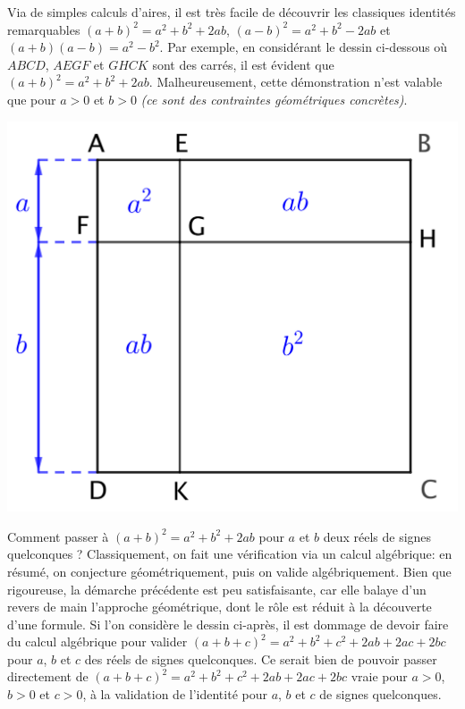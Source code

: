 Via de simples calculs d'aires, il est très facile de découvrir les classiques identités remarquables
$(a + b)^2 = a^2 + b^2 + 2ab$,
$(a - b)^2 = a^2 + b^2 - 2ab$
et
$(a + b)(a - b) = a^2 - b^2$.
%
Par exemple, en considérant le dessin ci-dessous où $ABCD$, $AEGF$ et $GHCK$ sont des carrés,
il est évident que $(a + b)^2 = a^2 + b^2 + 2 ab$.
Malheureusement, cette démonstration n'est valable que pour $a > 0$ et $b > 0$ \emph{(ce sont des contraintes géométriques concrètes)}.

\begin{center}
	\includegraphics[scale = .7]{(a+b)^2.png}
\end{center}


Comment passer à $(a + b)^2 = a^2 + b^2 + 2 ab$ pour $a$ et $b$ deux réels de signes quelconques ?
Classiquement, on fait une vérification via un calcul algébrique: en résumé, on conjecture géométriquement, puis on valide algébriquement.
%
Bien que rigoureuse, la démarche précédente est peu satisfaisante, car elle balaye d'un revers de main l'approche géométrique, dont le rôle est réduit à la découverte d'une formule.
Si l'on considère le dessin ci-après, il est dommage de devoir faire du calcul algébrique pour valider $(a + b + c)^2 = a^2 + b^2 + c^2 + 2 ab + 2 ac + 2 bc$ pour $a$, $b$ et $c$ des réels de signes quelconques.
Ce serait bien de pouvoir passer directement de $(a + b + c)^2 = a^2 + b^2 + c^2 + 2 ab + 2 ac + 2 bc$ vraie pour $a > 0$, $b > 0$ et $c > 0$, à la validation de l'identité pour $a$, $b$ et $c$ de signes quelconques.

